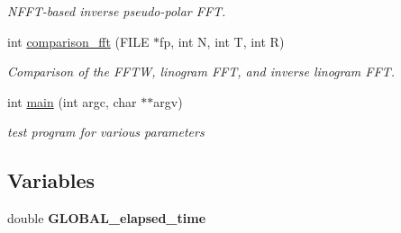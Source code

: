 \begin{CompactItemize}
\begin{CompactList}\small\item\em NFFT-based inverse pseudo-polar FFT. \item\end{CompactList}\item 
\hypertarget{group__applications__polarFFT__linogramm_ga5}{
int \hyperlink{group__applications__polarFFT__linogramm_ga5}{comparison\_\-fft} (FILE $\ast$fp, int N, int T, int R)}
\label{group__applications__polarFFT__linogramm_ga5}

\begin{CompactList}\small\item\em Comparison of the FFTW, linogram FFT, and inverse linogram FFT. \item\end{CompactList}\item 
\hypertarget{group__applications__polarFFT__linogramm_ga6}{
int \hyperlink{group__applications__polarFFT__linogramm_ga6}{main} (int argc, char $\ast$$\ast$argv)}
\label{group__applications__polarFFT__linogramm_ga6}

\begin{CompactList}\small\item\em test program for various parameters \item\end{CompactList}\end{CompactItemize}
\subsection*{Variables}
\begin{CompactItemize}
\item 
\hypertarget{group__applications__polarFFT__linogramm_ga0}{
double {\bf GLOBAL\_\-elapsed\_\-time}}
\label{group__applications__polarFFT__linogramm_ga0}

\end{CompactItemize}

